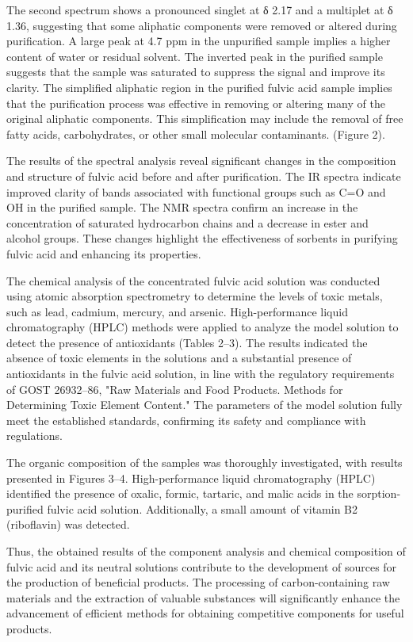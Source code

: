 \begin{multicols}{2}
The second spectrum shows a pronounced singlet at δ 2.17 and a multiplet
at δ 1.36, suggesting that some aliphatic components were removed or
altered during purification. A large peak at 4.7 ppm in the unpurified
sample implies a higher content of water or residual solvent. The
inverted peak in the purified sample suggests that the sample was
saturated to suppress the signal and improve its clarity. The simplified
aliphatic region in the purified fulvic acid sample implies that the
purification process was effective in removing or altering many of the
original aliphatic components. This simplification may include the
removal of free fatty acids, carbohydrates, or other small molecular
contaminants. (Figure 2).

The results of the spectral analysis reveal significant changes in the
composition and structure of fulvic acid before and after purification.
The IR spectra indicate improved clarity of bands associated with
functional groups such as C=O and OH in the purified sample. The NMR
spectra confirm an increase in the concentration of saturated
hydrocarbon chains and a decrease in ester and alcohol groups. These
changes highlight the effectiveness of sorbents in purifying fulvic acid
and enhancing its properties.

The chemical analysis of the concentrated fulvic acid solution was
conducted using atomic absorption spectrometry to determine the levels
of toxic metals, such as lead, cadmium, mercury, and arsenic.
High-performance liquid chromatography (HPLC) methods were applied to
analyze the model solution to detect the presence of antioxidants
(Tables 2--3). The results indicated the absence of toxic elements in
the solutions and a substantial presence of antioxidants in the fulvic
acid solution, in line with the regulatory requirements of GOST
26932--86, "Raw Materials and Food Products. Methods for Determining
Toxic Element Content." The parameters of the model solution fully meet
the established standards, confirming its safety and compliance with
regulations.

The organic composition of the samples was thoroughly investigated, with
results presented in Figures 3--4. High-performance liquid
chromatography (HPLC) identified the presence of oxalic, formic,
tartaric, and malic acids in the sorption-purified fulvic acid solution.
Additionally, a small amount of vitamin B2 (riboflavin) was detected.

Thus, the obtained results of the component analysis and chemical
composition of fulvic acid and its neutral solutions contribute to the
development of sources for the production of beneficial products. The
processing of carbon-containing raw materials and the extraction of
valuable substances will significantly enhance the advancement of
efficient methods for obtaining competitive components for useful
products.


\end{multicols}
